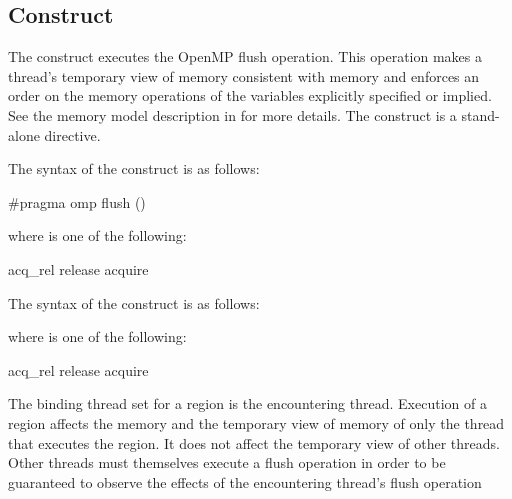 \subsection{ Construct}
\label{subsec:flush Construct}
\summary
The  construct executes the OpenMP flush operation. This operation makes a
thread's temporary view of memory consistent with memory and enforces an order on
the memory operations of the variables explicitly specified or implied. See the memory
model description in  for more details. The  construct is a
stand-alone directive.

\syntax
\begin{ccppspecific}
The syntax of the  construct is as follows:

\begin{ompcPragma}
#pragma omp flush  \plc{[}()\plc{] new-line}
\end{ompcPragma}
\begin{samepage}
where  is one of the following:

\begin{indentedcodelist}
acq_rel
release
acquire
\end{indentedcodelist}
\end{samepage}
\end{ccppspecific}

\begin{fortranspecific}
The syntax of the  construct is as follows:

\begin{samepage}
where  is one of the following:

\begin{indentedcodelist}
acq_rel
release
acquire
\end{indentedcodelist}
\end{samepage}
\end{fortranspecific}

\binding
The binding thread set for a  region is the encountering thread. Execution of a
 region affects the memory and the temporary view of memory of only the thread
that executes the region. It does not affect the temporary view of other threads. Other
threads must themselves execute a flush operation in order to be guaranteed to observe
the effects of the encountering thread's flush operation

